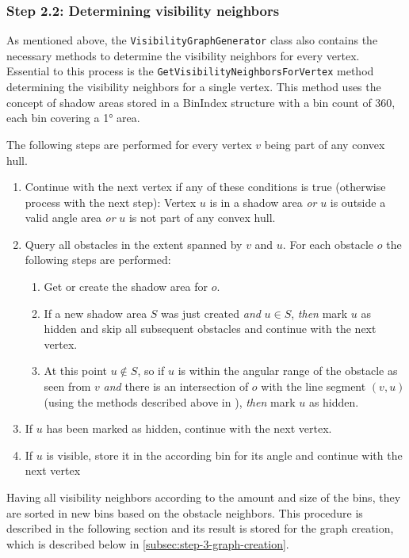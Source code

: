 		\subsubsection{Step 2.2: Determining visibility neighbors}
		
			As mentioned above, the \texttt{VisibilityGraphGenerator} class also contains the necessary methods to determine the visibility neighbors for every vertex.
			Essential to this process is the \texttt{GetVisibilityNeighborsForVertex} method determining the visibility neighbors for a single vertex.
			This method uses the concept of shadow areas stored in a BinIndex structure with a bin count of 360, each bin covering a 1° area.
			
			The following steps are performed for every vertex $v$ being part of any convex hull.
			\begin{enumerate}[leftmargin=2.25em+\widthof{2.2.},label={2.2.\arabic*.}]
				\item Continue with the next vertex if any of these conditions is true (otherwise process with the next step): Vertex $u$ is in a shadow area \emph{or} $u$ is outside a valid angle area \emph{or} $u$ is not part of any convex hull.
				\item Query all obstacles in the extent spanned by $v$ and $u$. For each obstacle $o$ the following steps are performed:
				\begin{enumerate}[leftmargin=2.25em+\widthof{2.2.}-1em]
					\item Get or create the shadow area for $o$.
					\item If a new shadow area $S$ was just created \emph{and} $u \in S$, \emph{then} mark $u$ as hidden and skip all subsequent obstacles and continue with the next vertex.\label{itm:if-u-not-on-obstacle}
					\item At this point $u \not\in S$, so if $u$ is within the angular range of the obstacle as seen from $v$ \emph{and} there is an intersection of $o$ with the line segment $(v, u)$ (using the methods described above in \emph{}), \emph{then} mark $u$ as hidden.
				\end{enumerate}
				\item If $u$ has been marked as hidden, continue with the next vertex.
				\item If $u$ is visible, store it in the according bin for its angle and continue with the next vertex
			\end{enumerate}
			Having all visibility neighbors according to the amount and size of the bins, they are sorted in new bins based on the obstacle neighbors.
			This procedure is described in the following section and its result is stored for the graph creation, which is described below in \cref{subsec:step-3-graph-creation}.
		
